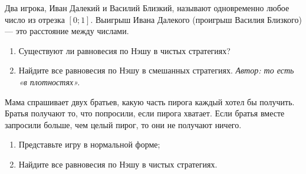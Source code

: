 \begin{problem}\par
Два игрока, Иван Далекий и Василий Близкий, называют одновременно любое число из отрезка  $\left[0;1\right]$. Выигрыш Ивана Далекого (проигрыш Василия Близкого) — это расстояние между числами.\par
\begin{enumerate}
\item 	Существуют ли равновесия по Нэшу в чистых стратегиях?\par
\item 	Найдите все равновесия по Нэшу в смешанных стратегиях.
{\it \red Автор: то есть «в плотностях». }
\end{enumerate}


\begin{sol}

\end{sol}
\end{problem}



\begin{problem}
Мама спрашивает двух братьев, какую часть пирога каждый хотел бы получить. Братья получают то, что попросили, если пирога хватает. Если братья вместе запросили больше, чем целый пирог, то они не получают ничего.\par
\begin{enumerate}
\item 	Представьте игру в нормальной форме;\par
\item 	Найдите все равновесия по Нэшу в чистых стратегиях.
\end{enumerate}


\begin{sol}

\end{sol}
\end{problem}



